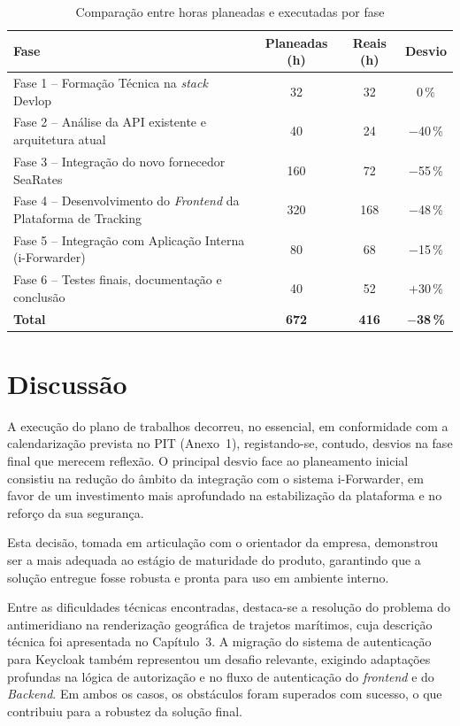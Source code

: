 \documentclass[a4paper,12pt]{report}
\begin{document}
\begin{table}[H]
\centering
\caption{Comparação entre horas planeadas e executadas por fase}
\label{tab:comparacao-horas}
\small
\begin{tabular}{|p{}|c|c|c|}
\hline
\textbf{Fase} & \textbf{Planeadas (h)} & \textbf{Reais (h)} & \textbf{Desvio} \\
\hline
Fase 1 -- Formação Técnica na \textit{stack} Devlop & 32 & 32 & 0\,\% \\
\hline
Fase 2 -- Análise da API existente e arquitetura atual & 40 & 24 & $-$40\,\% \\
\hline
Fase 3 -- Integração do novo fornecedor SeaRates & 160 & 72 & $-$55\,\% \\
\hline
Fase 4 -- Desenvolvimento do \textit{Frontend} da Plataforma de Tracking & 320 & 168 & $-$48\,\% \\
\hline
Fase 5 -- Integração com Aplicação Interna (i-Forwarder) & 80 & 68 & $-$15\,\% \\
\hline
Fase 6 -- Testes finais, documentação e conclusão & 40 & 52 & +30\,\% \\
\hline
\textbf{Total} & \textbf{672} & \textbf{416} & \textbf{$-$38\,\%} \\
\hline
\end{tabular}
\end{table}

\section{Discussão}

A execução do plano de trabalhos decorreu, no essencial, em conformidade com a calendarização prevista no PIT (Anexo~1), registando-se, contudo, desvios na fase final que merecem reflexão. O principal desvio face ao planeamento inicial consistiu na redução do âmbito da integração com o sistema i-Forwarder, em favor de um investimento mais aprofundado na estabilização da plataforma e no reforço da sua segurança.

Esta decisão, tomada em articulação com o orientador da empresa, demonstrou ser a mais adequada ao estágio de maturidade do produto, garantindo que a solução entregue fosse robusta e pronta para uso em ambiente interno.

Entre as dificuldades técnicas encontradas, destaca-se a resolução do problema do antimeridiano na renderização geográfica de trajetos marítimos, cuja descrição técnica foi apresentada no Capítulo~3. A migração do sistema de autenticação para Keycloak também representou um desafio relevante, exigindo adaptações profundas na lógica de autorização e no fluxo de autenticação do \textit{frontend} e do \textit{Backend}. Em ambos os casos, os obstáculos foram superados com sucesso, o que contribuiu para a robustez da solução final.
\end{document}
